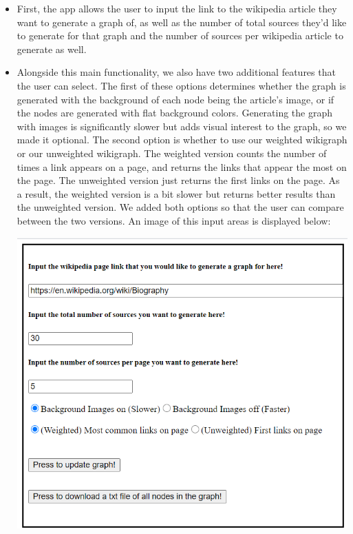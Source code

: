 \documentclass[fontsize=11pt]{article}
\begin{document}
\begin{enumerate}
\begin{itemize}
        \item First, the app allows the user to input the link to the wikipedia article they want to generate a graph of, as well as the number of total sources they'd like to generate for that graph and the number of sources per wikipedia article to generate as well. 
        
        \newpage
        
        \item Alongside this main functionality, we also have two additional features that the user can select. The first of these options determines whether the graph is generated with the background of each node being the article's image, or if the nodes are generated with flat background colors. Generating the graph with images is significantly slower but adds visual interest to the graph, so we made it optional. The second option is whether to use our weighted wikigraph or our unweighted wikigraph. The weighted version counts the number of times a link appears on a page, and returns the links that appear the most on the page. The unweighted version just returns the first links on the page. As a result, the weighted version is a bit slower but returns better results than the unweighted version. We added both options so that the user can compare between the two versions. An image of this input areas is displayed below:
        
        \includegraphics[scale=0.5]{graph_input_area.png}
        

\end{itemize}
\end{enumerate}
\end{document}
